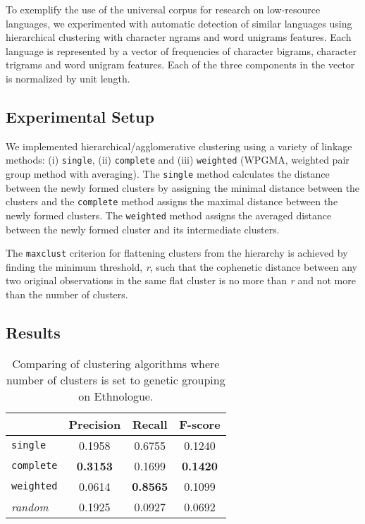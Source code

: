 To exemplify the use of the universal corpus for research on low-resource languages, we experimented with automatic detection of similar languages using hierarchical clustering with character ngrams and word unigrams features. Each language is represented by a vector of frequencies of  character bigrams, character trigrams and word unigram features. Each of the three components in the vector is normalized by unit length.


\subsection{Experimental Setup}
We implemented hierarchical/agglomerative clustering using a variety of linkage methods: (i) \texttt{single}, (ii) \texttt{complete} and (iii) \texttt{weighted} (WPGMA, weighted pair group method with averaging). The \texttt{single} method calculates the distance between the newly formed clusters by assigning the minimal distance between the clusters and the \texttt{complete} method assigns the maximal distance between the newly formed clusters. The \texttt{weighted} method assigns the averaged distance between the newly formed cluster and its intermediate clusters. 

The \texttt{maxclust} criterion for flattening clusters from the hierarchy is achieved by finding the minimum threshold, \emph{r}, such that the cophenetic distance between any two original observations in the same flat cluster is no more than \emph{r} and not more than the number of clusters.

\newpage
\subsection{Results}
\begin{table*}[h!]
\begin{centering}

    \begin{tabular}{l|ccc}
    ~        & Precision & Recall       & F-score    \\ \hline
    \texttt{single} & 0.1958	& 0.6755	 & 0.1240  \\
	\texttt{complete} & \textbf{0.3153}	& 0.1699	 & \textbf{0.1420} \\
	\texttt{weighted} & 0.0614	& \textbf{0.8565}	 & 0.1099 \\ \hline
	\emph{random} & 0.1925 &	0.0927 & 	0.0692 \\
    \end{tabular}
\caption{Comparing of clustering algorithms where number of clusters is set to genetic grouping on Ethnologue.}
\end{centering}
\label{tab:cluster}
\end{table*}

